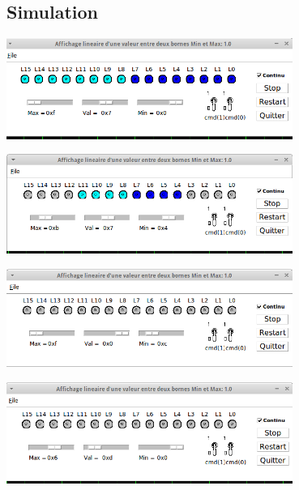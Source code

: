 \subsection{Simulation}

\begin{minipage}{\textwidth}
	\center
	\includegraphics[width = 0.7\textwidth]{figures/mode_base_1.png}
	\label{fig:4}
\end{minipage}

\begin{minipage}{\textwidth}
	\center
	\includegraphics[width = 0.7\textwidth]{figures/mode_base_2.png}
	\label{fig:5}
\end{minipage}

\begin{minipage}{\textwidth}
	\center
	\includegraphics[width = 0.7\textwidth]{figures/mode_base_depass_bas.png}
	\label{fig:6}
\end{minipage}

\begin{minipage}{\textwidth}
	\center
	\includegraphics[width = 0.7\textwidth]{figures/mode_base_depass_haut.png}
	\label{fig:7}
\end{minipage}

